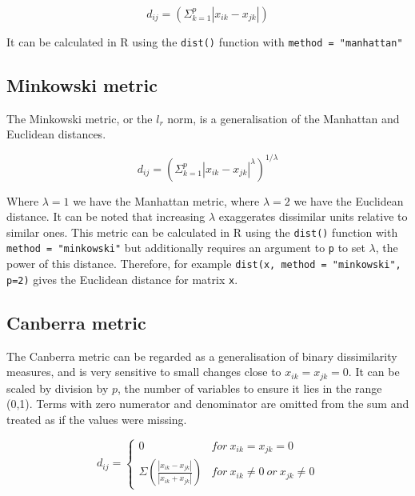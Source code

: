 \begin{displaymath}
\label{cityblockF}
d_{ij} =  \left( \Sigma_{k=1}^{p} |x_{ik} - x_{jk}| \right)
\end{displaymath}

It can be calculated in R using the \verb+dist()+ function with \verb+method = "manhattan"+



\subsection{Minkowski metric}
\label{minkowski}

The Minkowski metric, or the $l_{r}$ norm, is a generalisation of the Manhattan and Euclidean distances.

\begin{displaymath}
\label{minkowskiF}
d_{ij} =  \left( \Sigma_{k=1}^{p} |x_{ik} - x_{jk}|^\lambda \right)^{1/\lambda}
\end{displaymath}

Where $\lambda = 1$ we have the Manhattan metric, where $\lambda = 2$ we have the Euclidean distance.   It can be noted that increasing $\lambda$ exaggerates dissimilar units relative to similar ones.   This metric can be calculated in R using the \verb+dist()+ function with \verb+method = "minkowski"+ but additionally requires an argument to \verb+p+ to set $\lambda$, the power of this distance.   Therefore, for example \verb+dist(x, method = "minkowski", p=2)+ gives the Euclidean distance for matrix \verb+x+. 

\subsection{Canberra metric}
\label{canberra}

The Canberra metric \citep{Lance+Williams:1966} can be regarded as a generalisation of binary dissimilarity measures, and is very sensitive to small changes close to $x_{ik} = x_{jk} = 0$.   It can be scaled by division by $p$, the number of variables to ensure it lies in the range (0,1).   Terms with zero numerator and denominator are omitted from the sum and treated as if the values were missing.

\begin{displaymath}
\label{canberraF}
d_{ij} = \left\{ \begin{array}{ll} 0 & for\ x_{ik} = x_{jk} = 0\\
  \Sigma\left( \frac{|x_{ik} - x_{jk}|}{ |x_{ik} + x_{jk}|} \right) & for\  x_{ik} \neq 0\ or\  x_{jk} \neq 0 \end{array} \right.
\end{displaymath}


